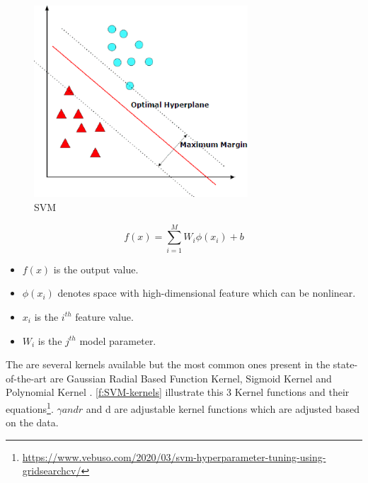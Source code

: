 \begin{figure}[h]
\centering
\includegraphics[width=8cm]{figures/Ch2/SVM.png}
\caption{SVM \cite{Hussain2011}}
\label{f:SVM}
\end{figure}

\begin{equation}\label{eq:SVR}
    f(x) = \sum_{i=1}^{M} W_i \phi(x_i) + b
\end{equation}

\begin{itemize}
    \item \begin{math}f(x)\end{math} is the output value.
    \item \begin{math}\phi(x_i)\end{math} denotes space with high-dimensional feature which can be nonlinear.
    \item \begin{math}x_i\end{math} is the \begin{math}i^{th}\end{math} feature value.
    \item \begin{math}W_i\end{math} is the \begin{math}j^{th}\end{math} model parameter.
\end{itemize}

The are several kernels available but the most common ones present in the state-of-the-art are Gaussian Radial Based Function Kernel, Sigmoid Kernel and Polynomial Kernel \cite{Hussain2011}. \autoref{f:SVM-kernels} illustrate this 3 Kernel functions and their equations\footnote{\url{https://www.vebuso.com/2020/03/svm-hyperparameter-tuning-using-gridsearchcv/}}.
\begin{math}\gamma and r \end{math} and d are adjustable kernel functions which are adjusted based on the data.

